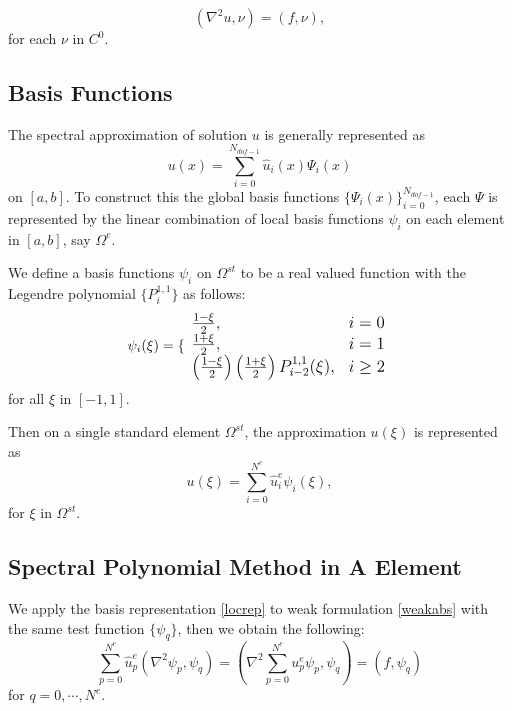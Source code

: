 \documentclass[11pt,letterpaper]{article}
\begin{document}
\begin{equation} \label{weakabs}
\left(\nabla^2 u, \nu \right) = \left(f, \nu\right),
\end{equation}
for each $\nu$ in $C^0$.

\subsection {Basis Functions}

The spectral approximation of solution $u$ is generally
represented as
\begin{equation}\label{genrep}
u(x) = \sum_{i=0}^{N_{dof-1}} \hat u_i(x)\Psi_i(x)
\end{equation}
on $[a, b]$. To construct this the global basis functions
$\{\Psi_i(x)\}_{i=0}^{N_{dof-1}}$, each $\Psi$ is represented by
the linear combination of local basis functions $\psi_i$ on each
element in $[a, b]$, say $\Omega^e$.

We define a basis functions ${\psi_i}$ on $\Omega^{st}$ to be a
real valued function with the Legendre polynomial $\{P_i^{1,1}\}$
as follows:
\begin{equation}\label{locbasis}
  \psi_i(\xi) =\large \{
  \begin{array}{ll}
  \frac{1-\xi}{2}, & i=0 \\
  \frac{1+\xi}{2}, & i=1 \\
  \left(\frac{1-\xi}{2}\right)\left(\frac{1+\xi}{2}\right)P_{i-2}^{1,1}(\xi),
  &i\ge 2
  \end{array}
\end{equation}
for all $\xi$ in $[-1, 1]$.

Then on a single standard element $\Omega^{st}$, the approximation
$u(\xi)$ is represented as
\begin{equation}\label{locrep}
u(\xi) = \sum_{i=0}^{N^e} \hat u_{i}^{e}\psi_i(\xi),
\end{equation}
for $\xi$ in $\Omega^{st}$.

\subsection {Spectral Polynomial Method in A Element}


We apply the basis representation \ref{locrep} to weak formulation
\ref{weakabs} with the same test function $\{\psi_q\}$, then we
obtain the following:
\begin{equation}\label{locmat}
 \sum_{p=0}^{N^e} \hat u_p^e \left(\nabla^2 \psi_p, \psi_q \right)
= \left(\nabla^2 \sum_{p=0}^{N^e} u_p^e \psi_p, \psi_q\right) =
\left( f, \psi_q \right)
\end{equation}
for $q = 0, \cdots, N^e$.
\end{document}
